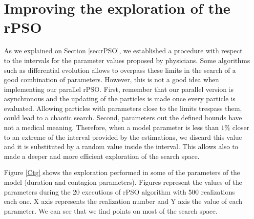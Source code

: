 \section{Improving the exploration of the rPSO}
As we explained on Section \ref{sec:rPSO}, we established a procedure with respect to the intervals for the parameter values proposed by physicians. Some algorithms such as differential evolution \cite{storn1997differential} allows to overpass these limits in the search of a good combination of parameters. However, this is not a good idea when implementing our parallel rPSO. First, remember that our parallel version is asynchronous and the updating of the particles is made once every particle is evaluated. Allowing particles with parameters close to the limits trespass them, could lead to a chaotic search. Second, parameters out the defined bounds have not a medical meaning. Therefore, when a model parameter is less than $1\%$ closer to an extreme of the interval provided by the  estimations, we discard this value and it is substituted by a random value inside the interval. This allows also to made a deeper and more efficient exploration of the search space.

Figure \ref{Ctg} shows the exploration performed in some of the parameters of the model (duration and contagion parameters). Figures represent the values of the parameters during the 20 executions of rPSO algorithm with 500 realizations each one. X axis represents the realization number and Y axis the value of each parameter. We can see that we find points on most of the search space.

